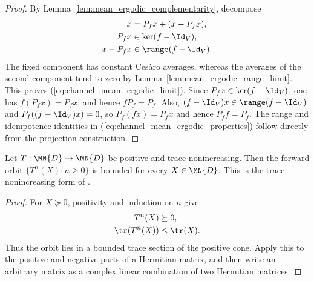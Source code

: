 \begin{proof}\leanok
    By Lemma~\ref{lem:mean_ergodic_complementarity}, decompose
    \begin{align}
        x      & =P_fx+(x-P_fx), \notag   \\
        P_fx   & \in\ker(f-\Id_V), \notag \\
        x-P_fx & \in\range(f-\Id_V).
    \end{align}
    The fixed component has constant Ces\`aro averages, whereas the averages
    of the second component tend to zero by
    Lemma~\ref{lem:mean_ergodic_range_limit}. This proves
    (\ref{eq:channel_mean_ergodic_limit}). Since
    $P_fx\in\ker(f-\Id_V)$, one has $f(P_fx)=P_fx$, and hence
    $fP_f=P_f$. Also, $(f-\Id_V)x\in\range(f-\Id_V)$ and
    $P_f((f-\Id_V)x)=0$, so $P_f(fx)=P_fx$ and hence $P_ff=P_f$.
    The range and idempotence identities in
    (\ref{eq:channel_mean_ergodic_properties}) follow directly from the
    projection construction.
\end{proof}

\begin{theorem}
    \label{thm:positive_trace_nonincreasing_bounded_orbits}
    \leanok
    Let $T:\MN{D}\to\MN{D}$ be positive and trace nonincreasing. Then the
    forward orbit $\{T^n(X):n\geq0\}$ is bounded for every $X\in\MN{D}$.
    This is the trace-nonincreasing form of
    \cite[Proposition~6.3]{Wolf2012Quantum}.
\end{theorem}

\begin{proof}\leanok
    For $X\succeq0$, positivity and induction on $n$ give
    \begin{align}
        T^n(X)      & \succeq0, \notag \\
        \tr(T^n(X)) & \leq\tr(X).
    \end{align}
    Thus the orbit lies in a bounded trace section of the positive cone.
    Apply this to the positive and negative parts of a Hermitian matrix, and
    then write an arbitrary matrix as a complex linear combination of two
    Hermitian matrices.
\end{proof}

